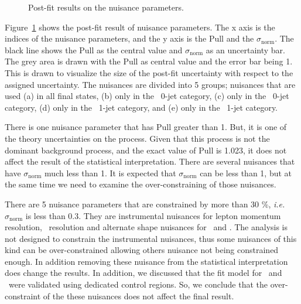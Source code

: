 \begin{figure}[!hbtp]
{}
\caption{Post-fit results on the nuisance parameters.}
\label{fig:postnuisance}
\end{figure}
Figure~\ref{fig:postnuisance} shows the post-fit result of nuisance parameters. 
The x axis is the indices of the nuisance parameters, and the y axis is the 
Pull and the $\sigma_{\textrm{norm}}$. The black line shows the Pull 
as the central value and 
$\sigma_{\textrm{norm}}$ as an uncertainty bar. The grey area is drawn with the Pull as 
central value and the error bar being 1. This is drawn to visualize the size of 
the post-fit uncertainty with respect to the assigned uncertainty. 
The nuisances are divided into 5 groups; nuisances that are used (a) in all final states, 
(b) only in the \DF\ 0-jet category,  (c) only in the \SF\ 0-jet category,  
(d) only in the \DF\ 1-jet category,  and (e) only in the \SF\ 1-jet category. 

There is one nuisance parameter that has Pull greater than 1. 
But, it is one of the theory uncertainties on the \ggww process. 
Given that this process is not the dominant background process, 
and the exact value of Pull is 1.023, it does not affect the
result of the statistical interpretation.
There are several nuisances that have $\sigma_{\textrm{norm}}$ much 
less than 1. It is expected that $\sigma_{\textrm{norm}}$ can be less than 1, 
but at the same time we need to examine the over-constraining of 
those nuisances. 

There are 5 nuisance parameters that are constrained by more than 30 \%, 
\textit{i.e.} $\sigma_{\textrm{norm}}$ is less than 0.3. They are 
instrumental nuisances for lepton momentum resolution, \met\ resolution 
and alternate shape nuisances for \qqww\ and \topbkg.
The analysis is not designed to constrain the instrumental nuisances, 
thus some nuisances of this kind can be over-constrained allowing 
others nuisance not being constrained enough. In addition removing 
these nuisance from the statistical interpretation does 
change the results. In addition, we discussed that the fit model 
for  \qqww\ and \topbkg\ were validated using dedicated control regions.  
So, we conclude that the over-constraint of the these nuisances does 
not affect the final result. 

